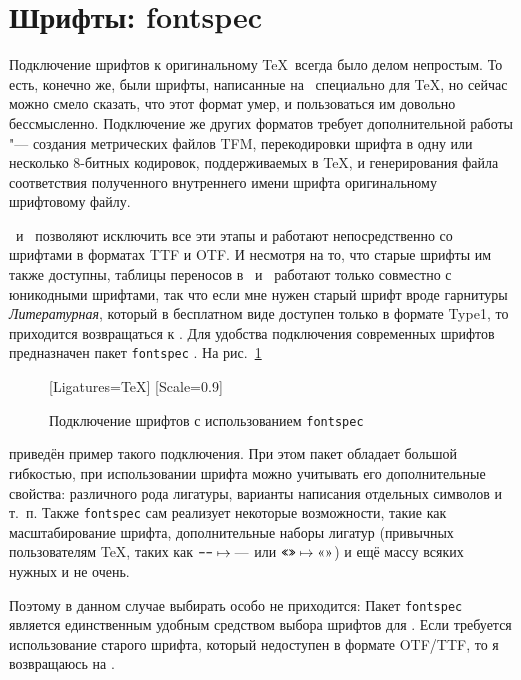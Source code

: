 \documentclass[a4paper,12pt,hyphens]{article}
\newcommand\softname[1]{\textit{#1}}
\newcommand\package[1]{\texttt{#1}}
\newcommand\lcmd[1]{\texttt{#1}}
\begin{document}
\section{Шрифты: fontspec}
Подключение шрифтов к оригинальному \TeX\ всегда было делом непростым.
То есть, конечно же, были шрифты, написанные на \METAFONT\ специально для
\TeX, но сейчас можно смело сказать, что этот формат умер, и пользоваться
им довольно бессмысленно. Подключение же других форматов требует
дополнительной работы "--- создания метрических файлов TFM, перекодировки
шрифта в одну или несколько 8-битных кодировок, поддерживаемых в \TeX,
и генерирования файла соответствия полученного внутреннего имени шрифта
оригинальному шрифтовому файлу.

\XeTeX\ и \LuaTeX\ позволяют исключить все эти этапы и работают
непосредственно со шрифтами в форматах TTF и OTF. И несмотря на то, что старые
шрифты им также доступны, таблицы переносов в \XeTeX\ и \LuaTeX\ работают только
совместно с юникодными шрифтами, так что если мне нужен старый шрифт вроде гарнитуры
\softname{Литературная}, который в бесплатном виде доступен только в формате Type1, то приходится
возвращаться к \pdfLaTeX. Для удобства подключения современных шрифтов
предназначен пакет \package{fontspec} \parencite{ctan-fontspec}.
На рис.~\ref{fontspec1}
\begin{figure}[tp]
\begin{latexcode}
\usepackage{fontspec}
\setmainfont{STIX Two Text}[Ligatures=TeX]
\setmonofont{PT Mono}[Scale=0.9]
\end{latexcode}
\caption{Подключение шрифтов с использованием
\package{fontspec}}\label{fontspec1}
\end{figure}
приведён пример такого подключения. При этом пакет обладает большой
гибкостью, при использовании шрифта можно учитывать его дополнительные
свойства: различного рода лигатуры, варианты написания отдельных
символов и т.~п. Также \package{fontspec} сам реализует некоторые
возможности, такие как масштабирование шрифта, дополнительные наборы
лигатур (привычных пользователям \TeX, таких как
$\mbox{\lcmd{---}}\mapsto\text{---}$ или $\mbox{\lcmd{<<>>}}\mapsto\text{<<>>}$)
и ещё массу всяких нужных и не очень.

Поэтому в данном случае выбирать особо не приходится: Пакет \package{fontspec}
является единственным удобным средством выбора шрифтов для \LuaLaTeX. Если требуется использование
старого шрифта, который недоступен в формате OTF/TTF, то я возвращаюсь на \pdfLaTeX.
\end{document}
